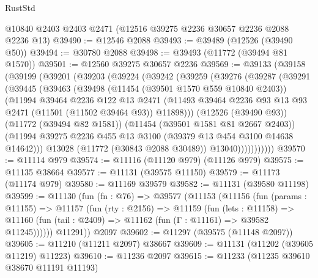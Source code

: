 \begin{lexlean}{RustStd}
\begin{coremodule}
    @10840
    @2403
    @2403
    @2471
    (@12516 @39275 @2236 @30657 @2236 @2088 @2236 @13)
@39490 := @12546 @2088
@39493 := @39489 (@12526 (@39490 @50))
@39494 := @30780 @2088
@39498 := @39493 (@11772 (@39494 @81 @1570))
@39501 := @12560 @39275 @30657 @2236
@39569 := @39133
    (@39158
      (@39199
        (@39201
          (@39203
            (@39224
              (@39242
                (@39259
                  (@39276
                    (@39287
                      (@39291
                        (@39445
                          (@39463
                            (@39498
                              (@11454 (@39501 @1570 @559 @10840 @2403))
                              (@11994
                                @39464
                                @2236
                                @122
                                @13
                                @2471
                                (@11493
                                  @39464
                                  @2236
                                  @93
                                  @13
                                  @93
                                  @2471
                                  (@11501 (@11502 @39464 @93))
                                  @11898)))
                            (@12526 (@39490 @93))
                            (@11772 (@39494 @82 @1581))
                            (@11454 (@39501 @1581 @81 @2667 @2403))
                            (@11994
                              @39275
                              @2236
                              @455
                              @13
                              @3100
                              (@39379 @13 @454 @3100 @14638 @14642)))
                          @13028
                          (@11772 (@30843 @2088 @30489))
                          @13040)))))))))))
@39570 := @11114 @979
@39574 := @11116 (@11120 @979) (@11126 @979)
@39575 := @11135 @38664
@39577 := @11131 (@39575 @11150)
@39579 := @11173 (@11174 @979)
@39580 := @11169 @39579
@39582 := @11131 (@39580 @11198)
@39599 := @11130
    (fun (fn : @76) =>
    @39577
      (@11153
        (@11156
          (fun (params : @11155) =>
          @11157
            (fun (rty : @2156) =>
            @11159
              (fun (lets : @11158) =>
              @11160 (fun (tail : @2409) => @11162 (fun (Γ : @11161) => @39582 @11245))))))
        @11291))
    @2097
@39602 := @11297 (@39575 (@11148 @2097))
@39605 := @11210 (@11211 @2097) @38667
@39609 := @11131 (@11202 (@39605 @11219) @11223)
@39610 := @11236 @2097
@39615 := @11233 (@11235 @39610 @38670 @11191 @11193)

\end{coremodule}
\end{lexlean}

